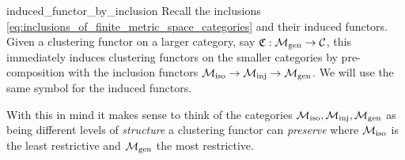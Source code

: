\begin{myremark}{}{induced_functor_by_inclusion}
Recall the inclusions \eqref{eq:inclusions_of_finite_metric_space_categories} and their induced functors.
Given a clustering functor on a larger category, say $\mathfrak{C}: {\mathcal{M}_\mathrm{gen}} \to \mathcal{C}$, this immediately induces clustering functors on the smaller categories by pre-composition with the inclusion functors ${\mathcal{M}_\mathrm{iso}} \to {\mathcal{M}_\mathrm{inj}} \to {\mathcal{M}_\mathrm{gen}}$. We will use the same symbol for the induced functors.
\end{myremark}

With this in mind it makes sense to think of the categories ${\mathcal{M}_\mathrm{iso}}, {\mathcal{M}_\mathrm{inj}}, {\mathcal{M}_\mathrm{gen}}$ as being different levels of \emph{structure} a clustering functor can \emph{preserve} where ${\mathcal{M}_\mathrm{iso}}$ is the least restrictive and ${\mathcal{M}_\mathrm{gen}}$ the most restrictive.